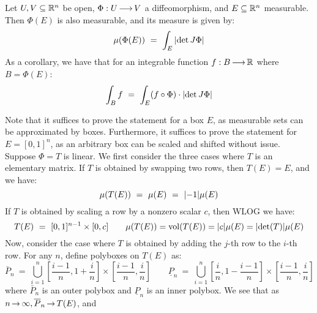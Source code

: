 \newpage
\begin{thm}[num=9.2,title=Change of Variables]
    Let $ U, V \subseteq \mathbb{R}^{n} $ be open, $ \Phi: U \operatorname{\longrightarrow} V $ a
    diffeomorphism, and $ E \subseteq \mathbb{R}^{n} $ measurable. Then $ \Phi(E) $ is
    also measurable, and its measure is given by:
    \begin{equation*}
        \mu(\Phi(E)) \ = \ \int_{E}\abs{\det J\Phi}
    \end{equation*}
    As a corollary, we have that for an integrable function $ f:B \operatorname{\longrightarrow} \mathbb{R} $
    where $ B = \Phi(E) $:
    \begin{equation*}
        \int_{B}f \ = \ \int_{E}(f \circ \Phi)\cdot\abs{\det J\Phi}
    \end{equation*}
\end{thm}

\begin{pf}[title=Linear case]
    Note that it suffices to prove the statement for a box $ E $, as measurable
    sets can be approximated by boxes. Furthermore, it suffices to prove the
    statement for $ E = [0,1]^{n} $, as an arbitrary box can be scaled and
    shifted without issue. \vsp
    Suppose $ \Phi = T $ is linear. We first consider the three cases where $ T $
    is an elementary matrix. \vsp
    If $ T $ is obtained by swapping two rows, then $ T(E) = E $, and we have:
    \begin{equation*}
        \mu(T(E)) \ = \ \mu(E) \ = \ \abs{-1}\mu(E)
    \end{equation*}
    If $ T $ is obtained by scaling a row by a nonzero scalar $ c $, then WLOG we
    have:
    \begin{equation*}
        T(E) \ = \ [0,1]^{n-1} \times [0, c] \qquad
        \mu(T(E)) = \operatorname{vol}(T(E)) = \abs{c}\mu(E) = \abs{\det(T)}\mu(E)
    \end{equation*}
    Now, consider the case where $ T $ is obtained by adding the $ j $-th row to
    the $ i $-th row. For any $ n $, define polyboxes on $ T(E) $ as:
    \begin{equation*}
        \bar{P}_{n} \ = \ \bigcup_{i=1}^{n}\left[\frac{i-1}{n},1+\frac{i}{n}
        \right]\times\left[\frac{i-1}{n},\frac{i}{n}\right] \qquad
        \underline{P}_{n} \ = \ \bigcup_{i=1}^{n}\left[\frac{i}{n},1-\frac{i-1}
        {n}\right]\times\left[\frac{i-1}{n},\frac{i}{n}\right]
    \end{equation*}
    where $ \bar{P}_{n} $ is an outer polybox and $ \underline{P}_{n} $ is an
    inner polybox. We see that as $ n \operatorname{\rightarrow} \infty, \overline{P}_{n} \operatorname{\rightarrow} T(E) $, and

\end{pf}
